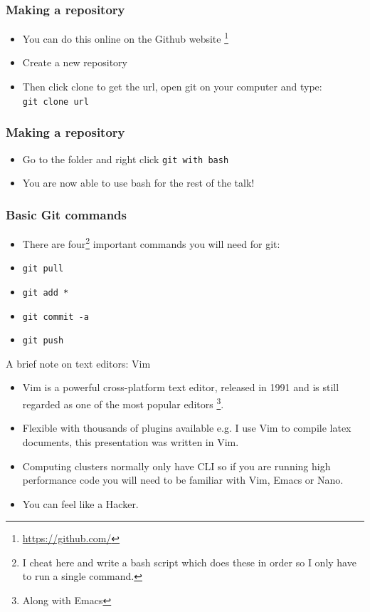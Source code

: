 \documentclass{beamer}
\begin{document}
\begin{frame}
\frametitle{Making a repository}
\begin{itemize}
\item You can do this online on the Github website \footnote{\url{https://github.com/}}
\item Create a new repository
\item Then click clone to get the url, open git on your computer and type: \\ 
	\texttt{git clone url}
\end{itemize}
\end{frame}

\begin{frame}
\frametitle{Making a repository}
\begin{itemize}
	\item Go to the folder and right click \texttt{git with bash}
\item You are now able to use bash for the rest of the talk!
\end{itemize}
\end{frame}

\begin{frame}
\frametitle{Basic Git commands}
\begin{itemize}
	\item There are four\footnote{I cheat here and write a bash script which does these in order so I only have to run a single command.} important commands you will need for git:
	\item \texttt{git pull}
	\item \texttt{git add *}
	\item \texttt{git commit -a}
	\item \texttt{git push}
\end{itemize}
\end{frame}


\begin{frame}{A brief note on text editors: Vim}
    \begin{itemize}
    \item Vim is a powerful cross-platform text editor, released in 1991 and is still regarded as one of the most popular editors \footnote{Along with Emacs}. 
    \item Flexible with thousands of plugins available e.g. I use Vim to compile latex documents, this presentation was written in Vim.  
    \item Computing clusters normally only have CLI so if you are running high performance code you will need to be familiar with Vim, Emacs or Nano.
    \item You can feel like a Hacker.
\end{itemize}
\end{frame}
\end{document}
